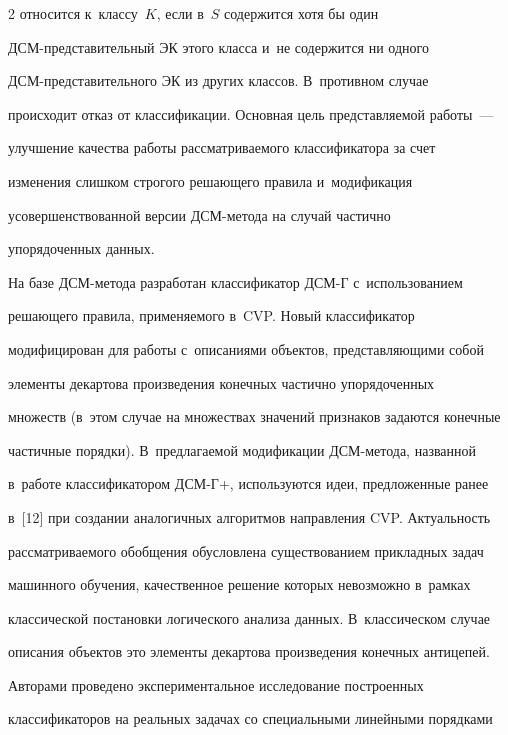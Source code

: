\begin{multicols}{2}
относится к~классу~$K$, если в~$S$ содержится хотя бы один  


ДСМ-пред\-ста\-ви\-тель\-ный ЭК этого класса и~не содержится ни одного  


ДСМ-пред\-ста\-ви\-тель\-но\-го ЭК из других классов. В~противном случае 


происходит отказ от классификации. Основная цель представляемой работы~--- 


улучшение качества работы рассматриваемого классификатора за счет 


изменения слишком строгого решающего правила и~модификация 


усовершенствованной версии ДСМ-ме\-то\-да на случай час\-тич\-но 


упорядоченных данных. 


  


  На базе ДСМ-ме\-то\-да разработан классификатор ДСМ-Г с~использованием 


решающего правила, применяемого в~CVP. Новый классификатор 


модифицирован для работы с~описаниями объектов, представляющими собой 


элементы декартова произведения конечных час\-тич\-но упорядоченных 


множеств (в~этом случае на множествах значений признаков задаются конечные 


час\-тич\-ные порядки). В~предлагаемой модификации ДСМ-ме\-то\-да, названной 


в~работе классификатором \mbox{ДСМ-Г+}, используются идеи, предложенные ранее 


в~[12] при создании аналогичных алгоритмов направления CVP. Актуальность 


рассматриваемого обобщения обусловлена существованием прикладных задач 


машинного обуче\-ния, качественное решение которых невозможно в~рамках 


классической постановки логического анализа данных. В~классическом случае 


описания объектов это элементы декартова произведения конечных антицепей. 


  


  Авторами проведено экспериментальное исследование построенных 


классификаторов на реальных задачах со специальными линейными по\-рядками 



\end{multicols}
